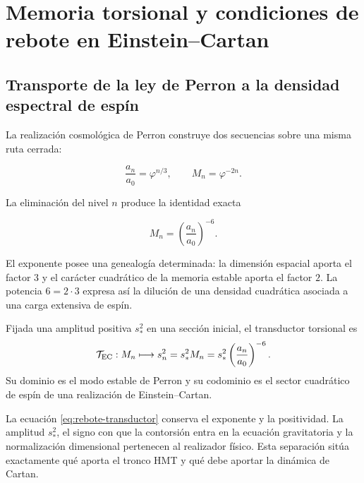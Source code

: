 \chapter{Memoria torsional y condiciones de rebote en Einstein--Cartan}
\label{ch:rebote-ec}

\section{Transporte de la ley de Perron a la densidad espectral de espín}

La realizaci\'on cosmol\'ogica de Perron construye dos secuencias sobre una
misma ruta cerrada:

\begin{equation}
 \frac{a_n}{a_0}=\varphi^{n/3},
 \qquad
 M_n=\varphi^{-2n}.
 \label{eq:rebote-perron-pair}
\end{equation}

La eliminaci\'on del nivel \(n\) produce la identidad exacta

\begin{equation}
 \boxed{M_n=\left(\frac{a_n}{a_0}\right)^{-6}.}
 \label{eq:rebote-memory-six}
\end{equation}

El exponente posee una genealog\'ia determinada: la dimensi\'on espacial
aporta el factor \(3\) y el car\'acter cuadr\'atico de la memoria estable
aporta el factor \(2\).  La potencia \(6=2\cdot3\) expresa as\'i la diluci\'on
de una densidad cuadr\'atica asociada a una carga extensiva de esp\'in.

\begin{definition}
Fijada una amplitud positiva \(s_*^2\) en una secci\'on inicial, el transductor
torsional es
\begin{equation}
 \mathcal T_{\rm EC}:M_n\longmapsto
 s_n^2=s_*^2M_n
 =s_*^2\left(\frac{a_n}{a_0}\right)^{-6}.
 \label{eq:rebote-transductor}
\end{equation}
Su dominio es el modo estable de Perron y su codominio es el sector
cuadr\'atico de esp\'in de una realizaci\'on de Einstein--Cartan.
\end{definition}

La ecuaci\'on \cref{eq:rebote-transductor} conserva el exponente y la
positividad.  La amplitud \(s_*^2\), el signo con que la contorsi\'on entra en
la ecuaci\'on gravitatoria y la normalizaci\'on dimensional pertenecen al
realizador f\'isico.  Esta separaci\'on sit\'ua exactamente qu\'e aporta el
tronco HMT y qu\'e debe aportar la din\'amica de Cartan.

